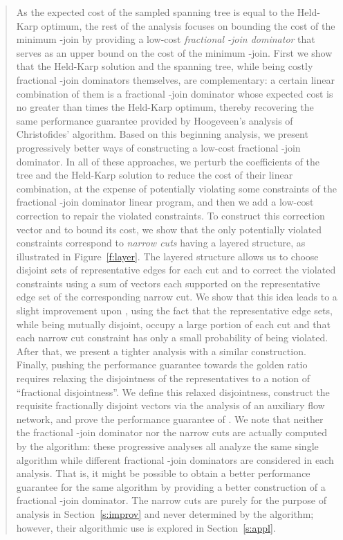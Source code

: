 \documentclass[11pt,letterpaper]{article}
\begin{document}
\begin{quote}
As the expected cost of the sampled spanning tree is equal to the Held-Karp optimum, the rest of the analysis focuses on bounding the cost of the minimum -join by providing a low-cost \emph{fractional -join dominator} that serves as an upper bound on the cost of the minimum -join. First we show that the Held-Karp solution and the spanning tree, while being costly fractional -join dominators themselves, are complementary: a certain linear combination of them is a fractional -join dominator whose expected cost is no greater than  times the Held-Karp optimum, thereby recovering the same  performance guarantee provided by Hoogeveen's analysis of Christofides' algorithm. Based on this beginning analysis, we present progressively better ways of constructing a low-cost fractional -join dominator. In all of these approaches, we perturb the coefficients of the tree and the Held-Karp solution to reduce the cost of their linear combination, at the expense of potentially violating some constraints of the fractional -join dominator linear program, and then we add a low-cost correction to repair the violated constraints. To construct this correction vector and to bound its cost, we show that the only potentially violated constraints correspond to \emph{narrow cuts} having a layered structure, as illustrated in Figure~\ref{f:layer}. The layered structure allows us to choose disjoint sets of representative edges for each cut and to correct the violated constraints using a sum of vectors each supported on the representative edge set of the corresponding narrow cut. We show that this idea leads to a slight improvement upon , using the fact that the representative edge sets, while being mutually disjoint, occupy a large portion of each cut and that each narrow cut constraint has only a small probability of being violated. After that, we present a tighter analysis with a similar construction. Finally, pushing the performance guarantee towards the golden ratio requires relaxing the disjointness of the representatives to a notion of ``fractional disjointness''. We define this relaxed disjointness, construct the requisite fractionally disjoint vectors via the analysis of an auxiliary flow network, and prove the performance guarantee of . We note that neither the fractional -join dominator nor the narrow cuts are actually computed by the algorithm: these progressive analyses all analyze the same single algorithm while different fractional -join dominators are considered in each analysis. That is, it might be possible to obtain a better performance guarantee for the same algorithm by providing a better construction of a fractional -join dominator. The narrow cuts are purely for the purpose of analysis in Section~\ref{s:improv} and never determined by the algorithm; however, their algorithmic use is explored in Section~\ref{s:appl}.


\end{quote}
\end{document}
